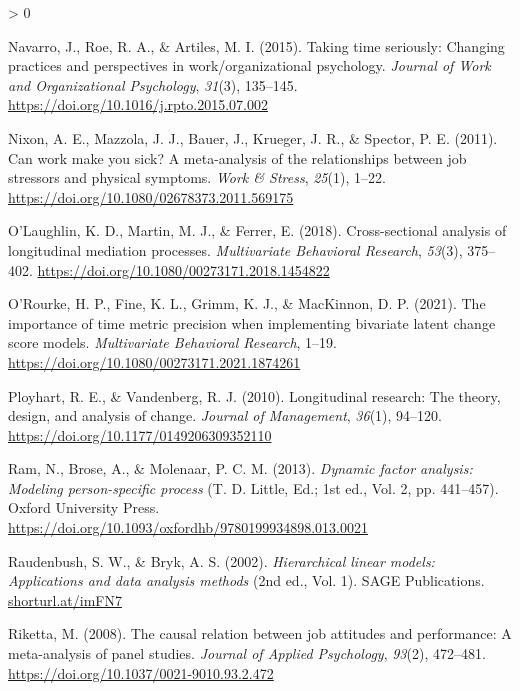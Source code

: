 \documentclass[
12pt, %
twoside,
english]{guelphthesis}
\newlength{\cslhangindent}
\newenvironment{CSLReferences}[2] %
 {%
  \setlength{\parindent}{0pt}
  \ifodd #1 \everypar{\setlength{\hangindent}{\cslhangindent}}\ignorespaces\fi
  \ifnum #2 > 0
  \setlength{\parskip}{\linespacing{2}}
  \fi
 }%
 {}
\begin{document}
\begin{CSLReferences}{1}{0}
\leavevmode{}%
Navarro, J., Roe, R. A., \& Artiles, M. I. (2015). Taking time seriously: Changing practices and perspectives in work/organizational psychology. \emph{Journal of Work and Organizational Psychology}, \emph{31}(3), 135--145. \url{https://doi.org/10.1016/j.rpto.2015.07.002}

\leavevmode{}%
Nixon, A. E., Mazzola, J. J., Bauer, J., Krueger, J. R., \& Spector, P. E. (2011). Can work make you sick? A meta-analysis of the relationships between job stressors and physical symptoms. \emph{Work \& Stress}, \emph{25}(1), 1--22. \url{https://doi.org/10.1080/02678373.2011.569175}

\leavevmode{}%
O'Laughlin, K. D., Martin, M. J., \& Ferrer, E. (2018). Cross-sectional analysis of longitudinal mediation processes. \emph{Multivariate Behavioral Research}, \emph{53}(3), 375--402. \url{https://doi.org/10.1080/00273171.2018.1454822}

\leavevmode{}%
O'Rourke, H. P., Fine, K. L., Grimm, K. J., \& MacKinnon, D. P. (2021). The importance of time metric precision when implementing bivariate latent change score models. \emph{Multivariate Behavioral Research}, 1--19. \url{https://doi.org/10.1080/00273171.2021.1874261}

\leavevmode{}%
Ployhart, R. E., \& Vandenberg, R. J. (2010). Longitudinal research: The theory, design, and analysis of change. \emph{Journal of Management}, \emph{36}(1), 94--120. \url{https://doi.org/10.1177/0149206309352110}

\leavevmode{}%
Ram, N., Brose, A., \& Molenaar, P. C. M. (2013). \emph{Dynamic factor analysis: Modeling person-specific process} (T. D. Little, Ed.; 1st ed., Vol. 2, pp. 441--457). Oxford University Press. \url{https://doi.org/10.1093/oxfordhb/9780199934898.013.0021}

\leavevmode{}%
Raudenbush, S. W., \& Bryk, A. S. (2002). \emph{Hierarchical linear models: Applications and data analysis methods} (2nd ed., Vol. 1). SAGE Publications. \href{https://shorturl.at/imFN7}{shorturl.at/imFN7}

\leavevmode{}%
Riketta, M. (2008). The causal relation between job attitudes and performance: A meta-analysis of panel studies. \emph{Journal of Applied Psychology}, \emph{93}(2), 472--481. \url{https://doi.org/10.1037/0021-9010.93.2.472}


\end{CSLReferences}
\end{document}
